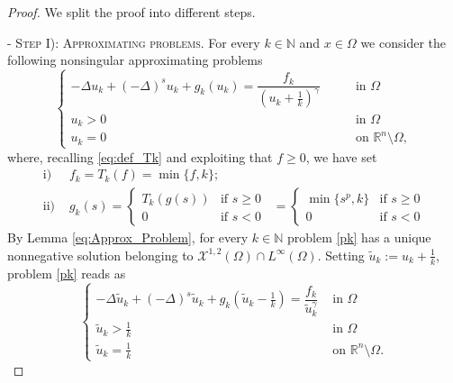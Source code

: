 \documentclass[10pt,a4paper]{amsart}
\def \N {\mathbb{N}}
\def \R {\mathbb{R}}
\def \XX {\mathcal{X}}
\begin{document}
\begin{proof}
We split the proof into different steps. 
  \vspace{0.2cm}

-\,\,\textsc{Step I): Approximating problems.} For every $k\in \mathbb{N}$ and $x\in\Omega$ we consider the following nonsingular approximating problems 
\begin{equation}\label{pk}
\left\{
\begin{array}{ll}
-\Delta u_k+(-\Delta)^s u_k +g_k(u_k)=\dfrac{f_k}{(u_k+\frac{1}{k})^{\gamma}}\qquad& \mbox{in }\Omega
\\
u_k>0& \mbox{in }\Omega
\\
u_k=0& \mbox{on }\mathbb{R}^n\setminus\Omega,
\end{array}
\right.
\end{equation}
where, recalling \eqref{eq:def_Tk} and exploiting that $f\geq 0$, we have set
\begin{align*}
	\mathrm{i)}\,\,&f_k= T_{k}(f) = \min\{f,k\}; \\
	\mathrm{ii)}\,\,&
	g_{k}(s)= \begin{cases}
		T_{k}(g(s)) & \text{if $s\geq 0$}\\
		0 & \text{if $s < 0$}
	\end{cases} 
	\,\,\,= \begin{cases}
		\min\{s^p,k\} & \text{if $s\geq 0$} \\
		0 & \text{if $s < 0$}
	\end{cases}
\end{align*}
By Lemma \ref{eq:Approx_Problem}, for every $k \in \N$ problem \eqref{pk} has a unique nonnegative solution belonging to $\XX^{1,2}(\Omega)\cap L^{\infty}(\Omega)$. Setting $\tilde u_k:=u_k+\frac{1}{k}$, problem \eqref{pk} reads as
\begin{equation*}
\begin{cases}-\Delta \tilde{u}_{k}+(-\Delta)^s\tilde u_k+g_k\left(\tilde u_k-\frac 1 k\right)=\dfrac{f_k}{\tilde{u}_{k}^{\gamma}} & \text { in } \Omega  \\ \tilde{u}_{k}>\frac{1}{k} & \text { in } \Omega \\ \tilde{u}_{k}=\frac{1}{k} & \text { on } \R^n\setminus \Omega .\end{cases}
\end{equation*}

\end{proof}
\end{document}
